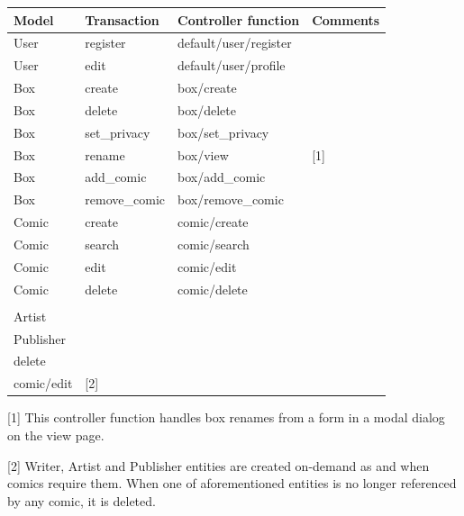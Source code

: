 \documentclass[fontsize=12pt,a4paper]{scrreprt}
\begin{document}
\begin{tabularx}{\linewidth}{lllX}\toprule
\textbf{Model} & \textbf{Transaction} & \textbf{Controller function} & \textbf{Comments} \\ \hline

User & register & default/user/register &  \\
User & edit & default/user/profile &  \\ \hline

Box & create & box/create &  \\
Box & delete & box/delete &  \\
Box & set\_privacy & box/set\_privacy &  \\
Box & rename & box/view & \textsf{[1]} \\
Box & add\_comic & box/add\_comic &  \\
Box & remove\_comic & box/remove\_comic &  \\ \hline

Comic & create & comic/create &  \\
Comic & search & comic/search &  \\
Comic & edit & comic/edit &  \\
Comic & delete & comic/delete &  \\ \hline

\begin{tabular}[c]{@{}l@{}}Writer\\ Artist\\ Publisher\end{tabular} & \begin{tabular}[c]{@{}l@{}}create\\ delete\end{tabular} & \begin{tabular}[c]{@{}l@{}}comic/create\\ comic/edit\end{tabular} & \textsf{[2]} \\

\bottomrule
\end{tabularx}

{
  \setlength{\parindent}{0pt}
  \setlength{\parskip}{0.4em}

  \textsf{[1]} This controller function handles box renames from a form in a modal dialog on the \textsf{view} page.

  \textsf{[2]} \textsf{Writer}, \textsf{Artist} and \textsf{Publisher} entities are created on-demand as and when comics require them. When one of aforementioned entities is no longer referenced by any comic, it is deleted.
}
\end{document}
